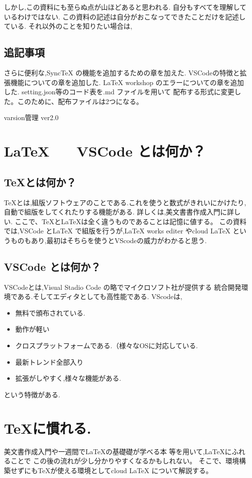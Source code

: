 \documentclass{ltjsarticle}
\begin{document}
しかし,この資料にも至らぬ点が山ほどあると思われる.
自分もすべてを理解しているわけではない.
この資料の記述は自分がおこなってできたことだけを記述している.
それ以外のことを知りたい場合は,

\subsection*{追記事項}
さらに便利な,SyncTeX の機能を追加するための章を加えた.
VSCodeの特徴と拡張機能についての章を追加した.
LaTeX workshop のエラーについての章を追加した.
setting.json等のコード表を.md ファイルを用いて
配布する形式に変更した。このために、配布ファイルは2つになる。

varsion管理  ver2.0
\tableofcontents

\section{\LaTeX　　VSCode とは何か？}
\subsection{\TeX とは何か？}
\TeX とは,組版ソフトウェアのことである.これを使うと数式がきれいにかけたり,
自動で組版をしてくれたりする機能がある.
詳しくは,美文書書作成入門\cite{美文書本}に詳しい.
ここで、\TeX と\LaTeX は全く違うものであることは記憶に値する。
この資料では,VSCode とLaTeX で組版を行うが,LaTeX works editer やcloud LaTeX 
というものもあり,最初はそちらを使うとVScodeの威力がわかると思う.
\subsection{VSCode とは何か？}
VSCodeとは,Visual Stadio Code の略でマイクロソフト社が提供する
統合開発環境である.そしてエディタとしても高性能である.
VScodeは,
\begin{itemize}
  \item 無料で頒布されている.
  \item 動作が軽い
  \item クロスプラットフォームである.（様々なOSに対応している.
  \item 最新トレンド全部入り
  \item 拡張がしやすく,様々な機能がある.
\end{itemize}
という特徴がある.
\section{\TeX に慣れる.}
美文書作成入門\cite{美文書本}や一週間で\LaTeX の基礎礎が学べる本
\cite{一週間基礎}等を用いて,\LaTeX にふれることで
この後の流れが少し分かりやすくなるかもしれない。
そこで、環境構築せずにも\TeX が使える環境としてcloud \LaTeX 
について解説する。
\end{document}
